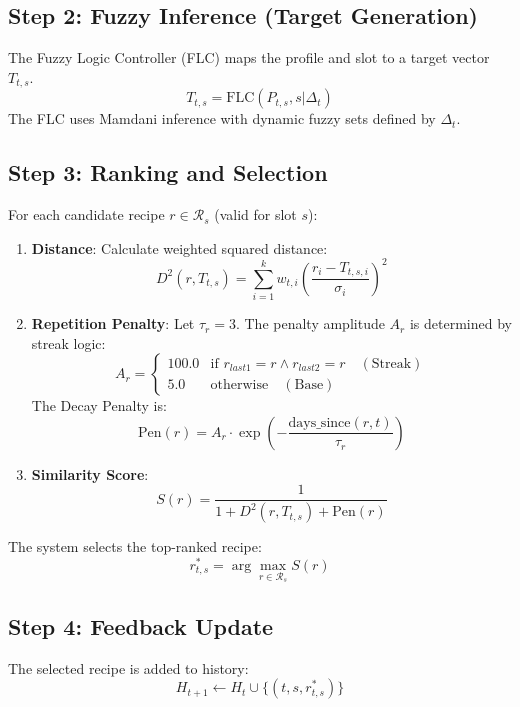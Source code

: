 \documentclass{article}
\begin{document}
\subsection{Step 2: Fuzzy Inference (Target Generation)}
The Fuzzy Logic Controller (FLC) maps the profile and slot to a target vector $T_{t,s}$.
\begin{equation}
T_{t,s} = \text{FLC}(P_{t,s}, s | \Delta_t)
\end{equation}
The FLC uses Mamdani inference with dynamic fuzzy sets defined by $\Delta_t$.

\subsection{Step 3: Ranking and Selection}
For each candidate recipe $r \in \mathcal{R}_s$ (valid for slot $s$):
\begin{enumerate}
    \item \textbf{Distance}: Calculate weighted squared distance:
    \begin{equation}
    D^2(r, T_{t,s}) = \sum_{i=1}^k w_{t,i} \left( \frac{r_i - T_{t,s,i}}{\sigma_i} \right)^2
    \end{equation}
    \item \textbf{Repetition Penalty}:
    Let $\tau_r = 3$. The penalty amplitude $A_r$ is determined by streak logic:
    \begin{equation}
    A_r = 
    \begin{cases} 
    100.0 & \text{if } r_{last1} = r \land r_{last2} = r \quad (\text{Streak}) \\
    5.0 & \text{otherwise} \quad (\text{Base})
    \end{cases}
    \end{equation}
    The Decay Penalty is:
    \begin{equation}
    \text{Pen}(r) = A_r \cdot \exp\left(-\frac{\text{days\_since}(r, t)}{\tau_r}\right)
    \end{equation}
    \item \textbf{Similarity Score}:
    \begin{equation}
    S(r) = \frac{1}{1 + D^2(r, T_{t,s}) + \text{Pen}(r)}
    \end{equation}
\end{enumerate}
The system selects the top-ranked recipe:
\begin{equation}
r^*_{t,s} = \arg\max_{r \in \mathcal{R}_s} S(r)
\end{equation}

\subsection{Step 4: Feedback Update}
The selected recipe is added to history:
\begin{equation}
H_{t+1} \leftarrow H_t \cup \{(t, s, r^*_{t,s})\}
\end{equation}
\end{document}
